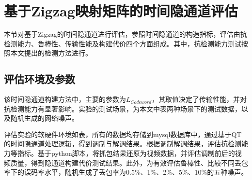 \section{基于Zigzag映射矩阵的时间隐通道评估}
\label{chap:zigzag:results}
本节对基于Zigzag的时间隐通道进行评估，参照时间隐通道的构造指标，评估由抗检测能力、鲁棒性、传输性能及构建代价四个方面组成。其中，抗检测能力测试按照本文提出的检测方法进行。

\subsection{评估环境及参数}
\label{chap:zigzag:results:environment}
该时间隐通道构建方法中，主要的参数为$L_{Codeword}$，其取值决定了传输性能，并对抗检测能力有显著影响。实验的测试场景，为本文中表两种场景下的测试数据，以及随机生成的网络噪声。


评估实验的软硬件环境如表，所有的数据均存储到mysql数据库中，通过基于QT的时间隐通道处理逻辑，得到调制与解调结果。根据调制解调结果，评估抗检测能力等指标。基于python脚本，将抓包结果还原为视频数据，并评估调制前后的视频质量，得到隐通道构建代价测试结果。此外，为有效评估鲁棒性、比较不同丢包率下的误码率水平，随机生成了丢包率为0.5\%、1\%、2\%、5\%、10\%的五种噪声。


